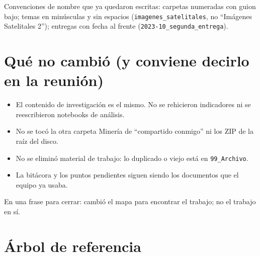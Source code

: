 \documentclass[11pt,a4paper]{article}
\begin{document}
Convenciones de nombre que ya quedaron escritas: carpetas numeradas con guion bajo; temas en minúsculas y sin espacios (\texttt{imagenes\_satelitales}, no ``Imágenes Satelitales 2''); entregas con fecha al frente (\texttt{2023-10\_segunda\_entrega}).

\section{Qué no cambió (y conviene decirlo en la reunión)}

\begin{itemize}
  \item El contenido de investigación es el mismo. No se rehicieron indicadores ni se reescribieron notebooks de análisis.
  \item No se tocó la otra carpeta Minería de ``compartido conmigo'' ni los ZIP de la raíz del disco.
  \item No se eliminó material de trabajo: lo duplicado o viejo está en \texttt{99\_Archivo}.
  \item La bitácora y los puntos pendientes siguen siendo los documentos que el equipo ya usaba.
\end{itemize}

En una frase para cerrar: cambió el mapa para encontrar el trabajo; no el trabajo en sí.

\section{Árbol de referencia}
\end{document}
